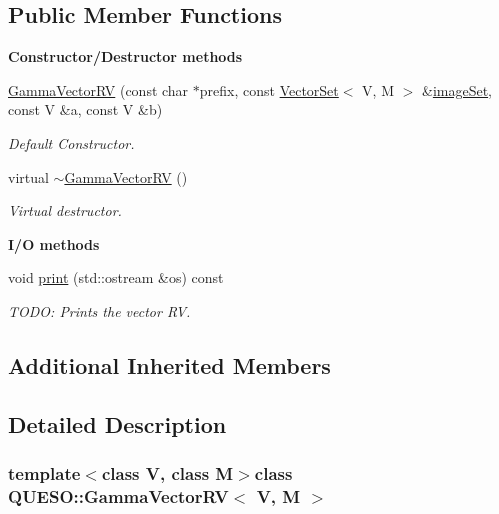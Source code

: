 \subsection*{Public Member Functions}
\begin{Indent}{\bf Constructor/\-Destructor methods}\par
\begin{DoxyCompactItemize}
\item 
\hyperlink{class_q_u_e_s_o_1_1_gamma_vector_r_v_ad1c46c32498c41976adf7f5c560eb930}{Gamma\-Vector\-R\-V} (const char $\ast$prefix, const \hyperlink{class_q_u_e_s_o_1_1_vector_set}{Vector\-Set}$<$ V, M $>$ \&\hyperlink{class_q_u_e_s_o_1_1_base_vector_r_v_aa4dd2f036228eac1f945bacc7147a922}{image\-Set}, const V \&a, const V \&b)
\begin{DoxyCompactList}\small\item\em Default Constructor. \end{DoxyCompactList}\item 
virtual \hyperlink{class_q_u_e_s_o_1_1_gamma_vector_r_v_aa1221113458fa26f8a79a8447ff0c341}{$\sim$\-Gamma\-Vector\-R\-V} ()
\begin{DoxyCompactList}\small\item\em Virtual destructor. \end{DoxyCompactList}\end{DoxyCompactItemize}
\end{Indent}
\begin{Indent}{\bf I/\-O methods}\par
\begin{DoxyCompactItemize}
\item 
void \hyperlink{class_q_u_e_s_o_1_1_gamma_vector_r_v_ae6b687ef1f325e3eea4dd63a1660110a}{print} (std\-::ostream \&os) const 
\begin{DoxyCompactList}\small\item\em T\-O\-D\-O\-: Prints the vector R\-V. \end{DoxyCompactList}\end{DoxyCompactItemize}
\end{Indent}
\subsection*{Additional Inherited Members}


\subsection{Detailed Description}
\subsubsection*{template$<$class V, class M$>$class Q\-U\-E\-S\-O\-::\-Gamma\-Vector\-R\-V$<$ V, M $>$}

